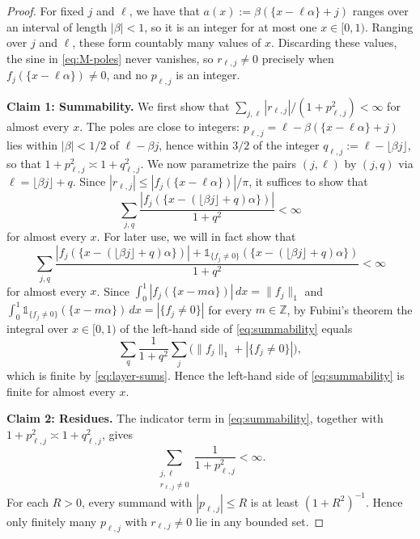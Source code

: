 \documentclass[reqno,a4paper,12pt]{amsart}
\numberwithin{equation}{section}
\def\Z{{\mathbb Z}}
\newcommand\1{\mathds{1}}
\begin{document}
\begin{proof}
For fixed $j$ and $\ell$, we have that $a(x):=\beta(\{x-\ell\alpha\}+j)$ ranges over
an interval of length $|\beta|<1$, so it is an integer for at most one
$x\in[0,1)$. Ranging over $j$ and $\ell$, these form countably many values
of $x$. Discarding these values, the sine in \eqref{eq:M-poles} never vanishes,
so $r_{\ell,j}\ne0$ precisely when $f_j(\{x-\ell\alpha\})\ne0$, and no
$p_{\ell,j}$ is an integer.

\smallskip\noindent\textbf{Claim 1: Summability.}
We first show that $\sum_{j,\ell}|r_{\ell,j}|/(1+p_{\ell,j}^2)<\infty$
for almost every $x$.  The poles are close to integers:
$p_{\ell,j}=\ell-\beta(\{x-\ell\alpha\}+j)$ lies within $|\beta|<1/2$
of $\ell-\beta j$, hence within $3/2$ of the integer
$q_{\ell,j}:=\ell-\lfloor\beta j\rfloor$, so that
$1+p_{\ell,j}^2\asymp1+q_{\ell,j}^2$.  We now parametrize the pairs
$(j,\ell)$ by $(j,q)$ via $\ell=\lfloor\beta j\rfloor+q$. Since
$|r_{\ell,j}|\leq|f_j(\{x-\ell\alpha\})|/\pi$, it suffices to show
that
\[
 \sum_{j,q}\frac{|f_j(\{x-(\lfloor\beta j\rfloor+q)\alpha\})|}{1+q^2}
 <\infty
\]
for almost every $x$.  For later use, we will in fact show that
\begin{equation}\label{eq:summability}
 \sum_{j,q}
 \frac{|f_j(\{x-(\lfloor\beta j\rfloor+q)\alpha\})|
 +\1_{\{f_j\ne0\}}(\{x-(\lfloor\beta j\rfloor+q)\alpha\})}
 {1+q^2}<\infty
\end{equation}
for almost every $x$.  Since
$\int_0^1|f_j(\{x-m\alpha\})|\,dx=\|f_j\|_1$ and
$\int_0^1\1_{\{f_j\ne0\}}(\{x-m\alpha\})\,dx=|\{f_j\ne0\}|$ for every
$m\in\Z$, by Fubini's theorem the integral over $x\in[0,1)$ of the
left-hand side of \eqref{eq:summability} equals
\[
 \sum_q\frac1{1+q^2}\sum_j\bigl(\|f_j\|_1+|\{f_j\ne0\}|\bigr),
\]
which is finite by \eqref{eq:layer-sums}. Hence the left-hand side of
\eqref{eq:summability} is finite for almost every $x$.

\smallskip\noindent\textbf{Claim 2: Residues.} 
The indicator term in \eqref{eq:summability}, together with
$1+p_{\ell,j}^2\asymp1+q_{\ell,j}^2$, gives
\[
 \sum_{\substack{j,\ell\\r_{\ell,j}\ne0}}
 \frac{1}{1+p_{\ell,j}^2}<\infty.
\]
For each $R>0$, every summand with $|p_{\ell,j}|\le R$
is at least $(1+R^2)^{-1}$. Hence only finitely many
$p_{\ell,j}$ with $r_{\ell,j}\ne0$ lie in any bounded set.


\end{proof}
\end{document}
